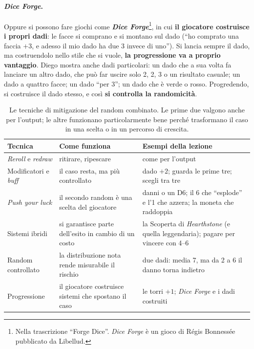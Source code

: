 \paragraph{\emph{Dice Forge}.} Oppure si possono fare giochi come
\textbf{\emph{Dice Forge}}\footnote{Nella trascrizione ``Forge Dice''. \emph{Dice Forge} è un
gioco di Régis Bonnessée pubblicato da Libellud.}, in cui \textbf{il giocatore costruisce i
propri dadi}: le facce si comprano e si montano sul dado (``ho comprato una faccia $+3$, e
adesso il mio dado ha due 3 invece di uno''). Si lancia sempre il dado, ma costruendolo nello
stile che si vuole, \textbf{la progressione va a proprio vantaggio}. Diego mostra anche dadi
particolari: un dado che a sua volta fa lanciare un altro dado, che può far uscire solo 2, 2, 3
o un risultato casuale; un dado a quattro facce; un dado ``per 3''; un dado che è verde o rosso.
Progredendo, si costruisce il dado stesso, e così \textbf{si controlla la randomicità}.

\begin{table}[htbp]
\centering
\small
\begin{tabular}{@{}>{\raggedright\arraybackslash}p{3.2cm}>{\raggedright\arraybackslash}p{5.4cm}>{\raggedright\arraybackslash}p{5.0cm}@{}}
\toprule
\textbf{Tecnica} & \textbf{Come funziona} & \textbf{Esempi della lezione} \\
\midrule
\emph{Reroll} e \emph{redraw} & ritirare, ripescare & come per l'output \\
\addlinespace
Modificatori e \emph{buff} & il caso resta, ma più controllato & dado $+2$; guarda le prime
  tre; scegli tra tre \\
\addlinespace
\emph{Push your luck} & il secondo random è una scelta del giocatore & 3 danni o un D6; il 6
  che ``esplode'' e l'1 che azzera; la moneta che raddoppia \\
\addlinespace
Sistemi ibridi & si garantisce parte dell'esito in cambio di un costo & la Scoperta di
  \emph{Hearthstone} (e quella leggendaria); pagare per vincere con 4--6 \\
\addlinespace
Random controllato & la distribuzione nota rende misurabile il rischio & due dadi: media 7,
  ma da 2 a 6 il danno torna indietro \\
\addlinespace
Progressione & il giocatore costruisce sistemi che spostano il caso & le torri $+1$;
  \emph{Dice Forge} e i dadi costruiti \\
\bottomrule
\end{tabular}
\caption{Le tecniche di mitigazione del random combinato. Le prime due valgono anche per
l'output; le altre funzionano particolarmente bene perché trasformano il caso in una scelta o
in un percorso di crescita.}
\label{a15:tab:combinato}
\end{table}

